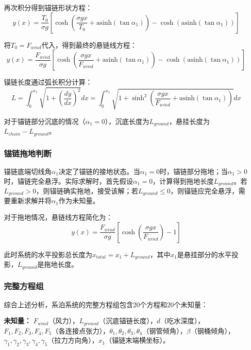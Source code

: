 \documentclass[withoutpreface,bwprint]{cumcmthesis}
\begin{document}
再次积分得到锚链形状方程：
\begin{equation}
\label{eq:悬链线完整}
y(x) = \frac{T_0}{\sigma g}\left[\cosh\left(\frac{\sigma g x}{T_0} + \text{asinh}(\tan\alpha_1)\right) - \cosh(\text{asinh}(\tan\alpha_1))\right]
\end{equation}

将$T_0 = F_{wind}$代入，得到最终的悬链线方程：
\begin{equation}
y(x) = \frac{F_{wind}}{\sigma g}\left[\cosh\left(\frac{\sigma g x}{F_{wind}} + \text{asinh}(\tan\alpha_1)\right) - \cosh(\text{asinh}(\tan\alpha_1))\right]
\end{equation}

锚链长度通过弧长积分计算：
\begin{equation}
\label{eq:锚链长度积分}
L = \int_0^{x_1} \sqrt{1 + \left(\frac{dy}{dx}\right)^2} dx = \int_0^{x_1} \sqrt{1 + \sinh^2\left(\frac{\sigma g x}{F_{wind}} + \text{asinh}(\tan\alpha_1)\right)} dx
\end{equation}

对于锚链部分沉底的情况（$\alpha_1 = 0$），沉底长度为$L_{ground}$，悬挂长度为$L_{chain} - L_{ground}$。

\subsubsection{锚链拖地判断}

锚链底端切线角$\alpha_1$决定了锚链的接地状态。当$\alpha_1 = 0$时，锚链部分拖地；当$\alpha_1 > 0$时，锚链完全悬浮。实际求解时，首先假设$\alpha_1 = 0$，计算得到拖地长度$L_{ground}$。若$L_{ground} > 0$，则锚链确实拖地，接受该解；若$L_{ground} \leq 0$，则锚链应完全悬浮，需要重新求解并将$\alpha_1$作为未知量。

对于拖地情况，悬链线方程简化为：
\begin{equation}
y(x) = \frac{F_{wind}}{\sigma g}\left[\cosh\left(\frac{\sigma g x}{F_{wind}}\right) - 1\right]
\end{equation}

此时系统的水平投影总长度为$x_{total} = x_1 + L_{ground}$，其中$x_1$是悬挂部分的水平投影，$L_{ground}$是拖地长度。

\subsubsection{完整方程组}

综合上述分析，系泊系统的完整方程组包含20个方程和20个未知量：

\textbf{未知量：}
$F_{wind}$（风力），$L_{ground}$（沉底锚链长度），$d$（吃水深度），$F_1, F_2, F_3, F_4, F_5$（各连接点张力），$\theta_1, \theta_2, \theta_3, \theta_4$（钢管倾角），$\beta$（钢桶倾角），$\gamma_1, \gamma_2, \gamma_3, \gamma_4, \gamma_5$（拉力方向角），$x_1$（锚链末端横坐标）。
\end{document}
